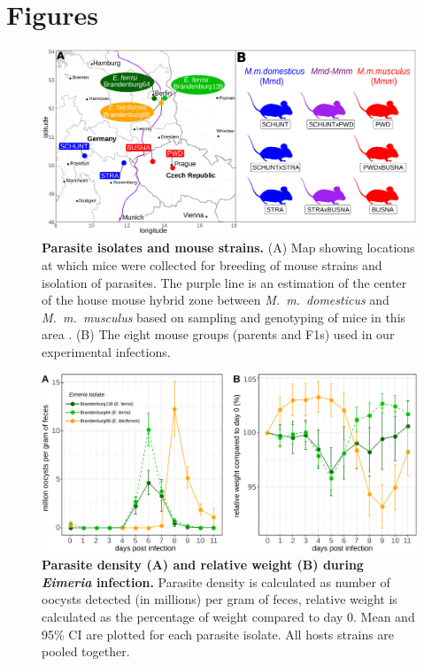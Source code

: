 \documentclass[12pt]{article}
\begin{document}
\section*{Figures}

\begin{figure}[H]
    \centering
    \includegraphics[width=\linewidth,height=\textheight,keepaspectratio]{images/Fig1_final.pdf}
    \caption{\textbf{Parasite isolates and mouse strains.} (A) Map showing locations at which mice were collected for breeding of mouse strains and isolation of parasites. The purple line is an estimation of the center of the house mouse hybrid zone between \textit{M.~m.~domesticus} and \textit{M.~m.~musculus} based on sampling and genotyping of mice in this area \citep{Balard2020, dureje_mouse_2012, macholan_widespread_2019}. (B) The eight mouse groups (parents and F1s) used in our experimental infections.}
\end{figure}

\begin{figure}[H]
    \centering
    \includegraphics[width=\linewidth,height=\textheight,keepaspectratio]{images/Fig2_final.pdf}
    \caption{\textbf{Parasite density (A) and relative weight (B) during \textit{Eimeria} infection.} Parasite density is calculated as number of oocysts detected (in millions) per gram of feces, relative weight is calculated as the percentage of weight compared to day 0. Mean and 95\% CI are plotted for each parasite isolate. All hosts strains are pooled together.}
\end{figure}
\end{document}
